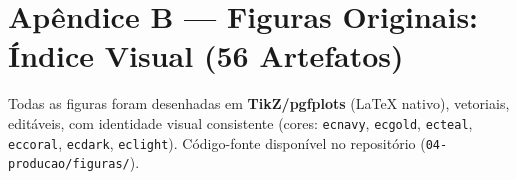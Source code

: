 \chapter*{Apêndice B — Figuras Originais: Índice Visual (56 Artefatos)}

Todas as figuras foram desenhadas em \textbf{TikZ/pgfplots} (LaTeX nativo), vetoriais, editáveis, com identidade visual consistente (cores: \texttt{ecnavy}, \texttt{ecgold}, \texttt{ecteal}, \texttt{eccoral}, \texttt{ecdark}, \texttt{eclight}). Código-fonte disponível no repositório (\texttt{04-producao/figuras/}).

